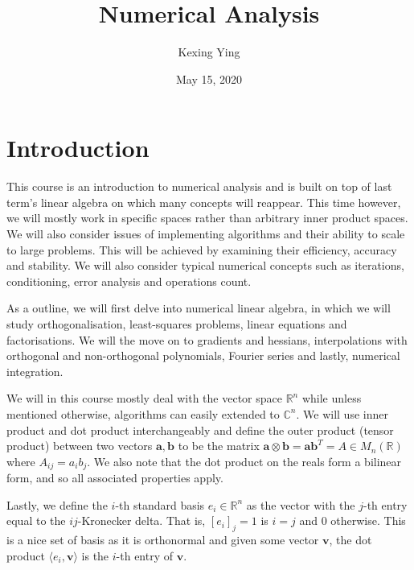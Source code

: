 \documentclass[
]{article}
\title{Numerical Analysis}
\author{Kexing Ying}
\date{May 15, 2020}
\theoremstyle{definition}
\theoremstyle{definition}
\begin{document}
\maketitle

{
\hypersetup{linkcolor=}
\setcounter{tocdepth}{2}
\tableofcontents
}
\newpage

\hypertarget{introduction}{%
\section{Introduction}\label{introduction}}

This course is an introduction to numerical analysis and is built on top
of last term's linear algebra on which many concepts will reappear. This
time however, we will mostly work in specific spaces rather than
arbitrary inner product spaces. We will also consider issues of
implementing algorithms and their ability to scale to large problems.
This will be achieved by examining their efficiency, accuracy and
stability. We will also consider typical numerical concepts such as
iterations, conditioning, error analysis and operations count.

As a outline, we will first delve into numerical linear algebra, in
which we will study orthogonalisation, least-squares problems, linear
equations and factorisations. We will the move on to gradients and
hessians, interpolations with orthogonal and non-orthogonal polynomials,
Fourier series and lastly, numerical integration.

We will in this course mostly deal with the vector space
\(\mathbb{R}^n\) while unless mentioned otherwise, algorithms can easily
extended to \(\mathbb{C}^n\). We will use inner product and dot product
interchangeably and define the outer product (tensor product) between
two vectors \(\mathbf{a}, \mathbf{b}\) to be the matrix
\(\mathbf{a}\otimes\mathbf{b = }\mathbf{a}\mathbf{b}^T = A \in M_n(\mathbb{R})\)
where \(A_{ij} = a_ib_j\). We also note that the dot product on the
reals form a bilinear form, and so all associated properties apply.

Lastly, we define the \(i\)-th standard basis \(e_i \in \mathbb{R}^n\)
as the vector with the \(j\)-th entry equal to the \(ij\)-Kronecker
delta. That is, \([e_i]_j = 1\) is \(i = j\) and \(0\) otherwise. This
is a nice set of basis as it is orthonormal and given some vector
\(\mathbf{v}\), the dot product \(\langle e_i, \mathbf{v} \rangle\) is
the \(i\)-th entry of \(\mathbf{v}\).

\newpage
\end{document}
